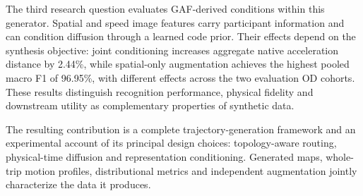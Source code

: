 The third research question evaluates GAF-derived conditions within this generator. Spatial and speed image features carry participant information and can condition diffusion through a learned code prior. Their effects depend on the synthesis objective: joint conditioning increases aggregate native acceleration distance by 2.44\%, while spatial-only augmentation achieves the highest pooled macro F1 of 96.95\%, with different effects across the two evaluation OD cohorts. These results distinguish recognition performance, physical fidelity and downstream utility as complementary properties of synthetic data.

The resulting contribution is a complete trajectory-generation framework and an experimental account of its principal design choices: topology-aware routing, physical-time diffusion and representation conditioning. Generated maps, whole-trip motion profiles, distributional metrics and independent augmentation jointly characterize the data it produces.
